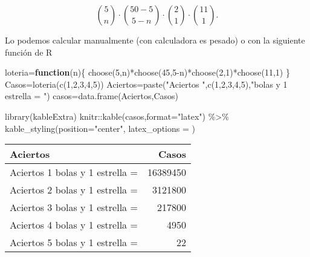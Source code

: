 \documentclass[
]{article}
\newenvironment{Shaded}{\begin{snugshade}}{\end{snugshade}}
\newcommand{\AttributeTok}[1]{\textcolor[rgb]{0.77,0.63,0.00}{#1}}
\newcommand{\ControlFlowTok}[1]{\textcolor[rgb]{0.13,0.29,0.53}{\textbf{#1}}}
\newcommand{\DecValTok}[1]{\textcolor[rgb]{0.00,0.00,0.81}{#1}}
\newcommand{\FunctionTok}[1]{\textcolor[rgb]{0.00,0.00,0.00}{#1}}
\newcommand{\NormalTok}[1]{#1}
\newcommand{\OtherTok}[1]{\textcolor[rgb]{0.56,0.35,0.01}{#1}}
\newcommand{\SpecialCharTok}[1]{\textcolor[rgb]{0.00,0.00,0.00}{#1}}
\newcommand{\StringTok}[1]{\textcolor[rgb]{0.31,0.60,0.02}{#1}}
\begin{document}
\[
\binom{5}{n}\cdot \binom{50-5}{5-n}\cdot \binom{2}{1}\cdot \binom{11}{1}.
\]

Lo podemos calcular manualmente (con calculadora es pesado) o con la
siguiente función de R

\begin{Shaded}
\begin{Highlighting}[]
\NormalTok{loteria}\OtherTok{=}\ControlFlowTok{function}\NormalTok{(n)\{}
\FunctionTok{choose}\NormalTok{(}\DecValTok{5}\NormalTok{,n)}\SpecialCharTok{*}\FunctionTok{choose}\NormalTok{(}\DecValTok{45}\NormalTok{,}\DecValTok{5}\SpecialCharTok{{-}}\NormalTok{n)}\SpecialCharTok{*}\FunctionTok{choose}\NormalTok{(}\DecValTok{2}\NormalTok{,}\DecValTok{1}\NormalTok{)}\SpecialCharTok{*}\FunctionTok{choose}\NormalTok{(}\DecValTok{11}\NormalTok{,}\DecValTok{1}\NormalTok{)}
\NormalTok{\}}
\NormalTok{Casos}\OtherTok{=}\FunctionTok{loteria}\NormalTok{(}\FunctionTok{c}\NormalTok{(}\DecValTok{1}\NormalTok{,}\DecValTok{2}\NormalTok{,}\DecValTok{3}\NormalTok{,}\DecValTok{4}\NormalTok{,}\DecValTok{5}\NormalTok{))}
\NormalTok{Aciertos}\OtherTok{=}\FunctionTok{paste}\NormalTok{(}\StringTok{"Aciertos "}\NormalTok{,}\FunctionTok{c}\NormalTok{(}\DecValTok{1}\NormalTok{,}\DecValTok{2}\NormalTok{,}\DecValTok{3}\NormalTok{,}\DecValTok{4}\NormalTok{,}\DecValTok{5}\NormalTok{),}\StringTok{"bolas y  1 estrella = "}\NormalTok{)}
\NormalTok{casos}\OtherTok{=}\FunctionTok{data.frame}\NormalTok{(Aciertos,Casos)}

\FunctionTok{library}\NormalTok{(kableExtra)}
\NormalTok{knitr}\SpecialCharTok{::}\FunctionTok{kable}\NormalTok{(casos,}\AttributeTok{format=}\StringTok{"latex"}\NormalTok{) }\SpecialCharTok{\%\textgreater{}\%} \FunctionTok{kable\_styling}\NormalTok{(}\AttributeTok{position=}\StringTok{"center"}\NormalTok{, }\AttributeTok{latex\_options =}\NormalTok{ ) }
\end{Highlighting}
\end{Shaded}

\begin{table}
\centering
\begin{tabular}{l|r}
\hline
Aciertos & Casos\\
\hline
Aciertos  1 bolas y  1 estrella = & 16389450\\
\hline
Aciertos  2 bolas y  1 estrella = & 3121800\\
\hline
Aciertos  3 bolas y  1 estrella = & 217800\\
\hline
Aciertos  4 bolas y  1 estrella = & 4950\\
\hline
Aciertos  5 bolas y  1 estrella = & 22\\
\hline
\end{tabular}
\end{table}
\end{document}
